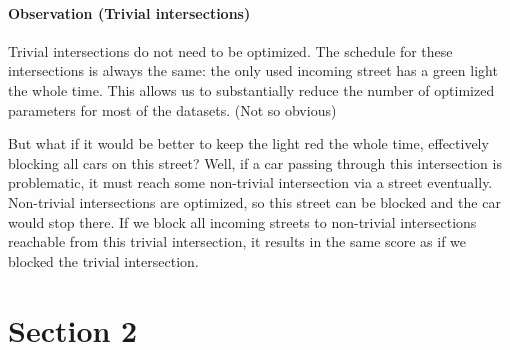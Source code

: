 \paragraph{Observation (Trivial intersections)} Trivial intersections do not need to be optimized. The schedule for these intersections is always the same: the only used incoming street has a green light the whole time. This allows us to substantially reduce the number of optimized parameters for most of the datasets. (Not so obvious)

But what if it would be better to keep the light red the whole time, effectively blocking all cars on this street? Well, if a car passing through this intersection is problematic, it must reach some non-trivial intersection via a street eventually. Non-trivial intersections are optimized, so this street can be blocked and the car would stop there. If we block all incoming streets to non-trivial intersections reachable from this trivial intersection, it results in the same score as if we blocked the trivial intersection.



\section{Section 2}
